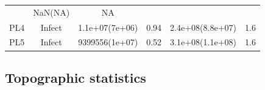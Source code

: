 \documentclass[]{article}
\begin{document}
\begin{longtable}[]{@{}cccccc@{}}
\begin{minipage}[t]{0.16\columnwidth}
\strut\end{minipage} &
\begin{minipage}[t]{0.17\columnwidth}\centering\strut
NaN(NA)
\strut\end{minipage} &
\begin{minipage}[t]{0.12\columnwidth}\centering\strut
NA
\strut\end{minipage}\tabularnewline
\begin{minipage}[t]{0.12\columnwidth}\centering\strut
PL4
\strut\end{minipage} &
\begin{minipage}[t]{0.12\columnwidth}\centering\strut
Infect
\strut\end{minipage} &
\begin{minipage}[t]{0.16\columnwidth}\centering\strut
1.1e+07(7e+06)
\strut\end{minipage} &
\begin{minipage}[t]{0.16\columnwidth}\centering\strut
0.94
\strut\end{minipage} &
\begin{minipage}[t]{0.17\columnwidth}\centering\strut
2.4e+08(8.8e+07)
\strut\end{minipage} &
\begin{minipage}[t]{0.12\columnwidth}\centering\strut
1.6
\strut\end{minipage}\tabularnewline
\begin{minipage}[t]{0.12\columnwidth}\centering\strut
PL5
\strut\end{minipage} &
\begin{minipage}[t]{0.12\columnwidth}\centering\strut
Infect
\strut\end{minipage} &
\begin{minipage}[t]{0.16\columnwidth}\centering\strut
9399556(1e+07)
\strut\end{minipage} &
\begin{minipage}[t]{0.16\columnwidth}\centering\strut
0.52
\strut\end{minipage} &
\begin{minipage}[t]{0.17\columnwidth}\centering\strut
3.1e+08(1.1e+08)
\strut\end{minipage} &
\begin{minipage}[t]{0.12\columnwidth}\centering\strut
1.6
\strut\end{minipage}\tabularnewline
\bottomrule
\end{longtable}

\newpage

\subsection{Topographic statistics}\label{topographic-statistics}
\end{document}
